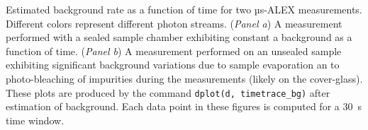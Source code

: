 \label{fig:bg_timetrace} Estimated background rate as a function of time for two µs-ALEX measurements. Different colors represent different photon streams. (\textit{Panel a}) A measurement performed with a sealed sample chamber exhibiting constant a background as a function of time. (\textit{Panel b}) A measurement performed on an unsealed sample exhibiting significant background variations due to sample evaporation an to photo-bleaching of impurities during the measurements (likely on the cover-glass). 
These plots are produced by the command
\texttt{dplot(d, timetrace\_bg)} after estimation of background.
Each data point in these figures is computed for a 30~s time window.
